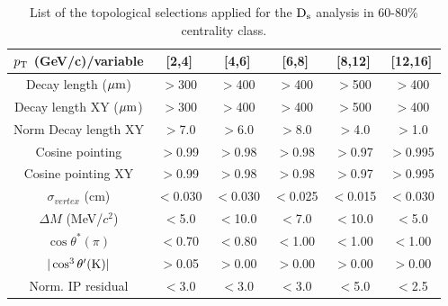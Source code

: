 \begin{table}[!h]
 \begin{center}
  \begin{tabular}{|c|c|c|c|c|c|}
\hline
$p_{\rm T}$ (GeV/c)/variable & [2,4] & [4,6] & [6,8] & [8,12] & [12,16] \\
\hline
\hline
Decay length ($\mathrm{\mu m}$)                 & $>$300 & $>$400 & $>$400 & $>$500 & $>$400\\
\hline
Decay length XY ($\mathrm{\mu m}$)            & $>$300 & $>$400 & $>$400 & $>$500 & $>$400\\
\hline
Norm Decay length XY                   & $>$7.0& $>$6.0 & $>$8.0 & $>$4.0 & $>$1.0\\
\hline
Cosine pointing                               & $>$0.99 & $>$0.98 & $>$0.98 & $>$0.97 & $>$0.995\\
\hline
Cosine pointing XY                          & $>$0.99 & $>$0.98 & $>$0.98 & $>$0.97 & $>$0.995\\
\hline
$\sigma_{vertex}$  (cm)                   & $<$0.030 & $<$0.030 & $<$0.025 & $<$0.015 & $<$0.030\\
\hline
$\Delta M$ (MeV/$c^{2}$) & $<$5.0 & $<$10.0 & $<$7.0 & $<$10.0 & $<$5.0\\
\hline
$\cos \theta^*(\pi)$                             & $<$0.70 & $<$0.80 & $<$1.00 & $<$1.00 & $<$1.00\\
\hline
$|\cos^3 \theta^\prime({\rm K})|$        & $>$0.05 & $>$0.00 & $>$0.00 & $>$0.00 & $>$0.00\\
\hline
Norm. IP residual                               & $<$3.0 & $<$3.0 & $<$3.0 & $<$5.0 & $<$2.5 \\[1ex]
\hline
  \end{tabular}
 \caption{List of the topological selections applied for the
   ${\rm D_s}$ analysis in 60-80\% centrality class.}
 \label{tab:topologicalselections_ds_6080}
 \end{center}
\end{table}

